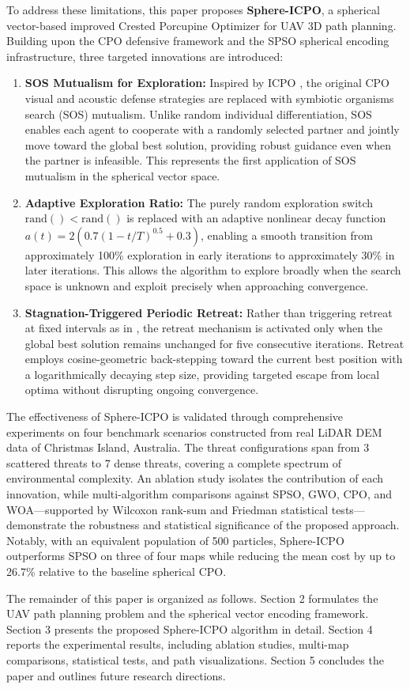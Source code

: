 To address these limitations, this paper proposes \textbf{Sphere-ICPO}, a spherical vector-based improved Crested Porcupine Optimizer for UAV 3D path planning. Building upon the CPO defensive framework and the SPSO spherical encoding infrastructure, three targeted innovations are introduced:

\begin{enumerate}
    \item \textbf{SOS Mutualism for Exploration:} Inspired by ICPO \cite{icpo2024}, the original CPO visual and acoustic defense strategies are replaced with symbiotic organisms search (SOS) mutualism. Unlike random individual differentiation, SOS enables each agent to cooperate with a randomly selected partner and jointly move toward the global best solution, providing robust guidance even when the partner is infeasible. This represents the first application of SOS mutualism in the spherical vector space.

    \item \textbf{Adaptive Exploration Ratio:} The purely random exploration switch $\text{rand}() < \text{rand}()$ is replaced with an adaptive nonlinear decay function $a(t) = 2(0.7(1 - t/T)^{0.5} + 0.3)$, enabling a smooth transition from approximately 100\% exploration in early iterations to approximately 30\% in later iterations. This allows the algorithm to explore broadly when the search space is unknown and exploit precisely when approaching convergence.

    \item \textbf{Stagnation-Triggered Periodic Retreat:} Rather than triggering retreat at fixed intervals as in \cite{icpo2024}, the retreat mechanism is activated only when the global best solution remains unchanged for five consecutive iterations. Retreat employs cosine-geometric back-stepping toward the current best position with a logarithmically decaying step size, providing targeted escape from local optima without disrupting ongoing convergence.
\end{enumerate}

The effectiveness of Sphere-ICPO is validated through comprehensive experiments on four benchmark scenarios constructed from real LiDAR DEM data of Christmas Island, Australia. The threat configurations span from 3 scattered threats to 7 dense threats, covering a complete spectrum of environmental complexity. An ablation study isolates the contribution of each innovation, while multi-algorithm comparisons against SPSO, GWO, CPO, and WOA—supported by Wilcoxon rank-sum and Friedman statistical tests—demonstrate the robustness and statistical significance of the proposed approach. Notably, with an equivalent population of 500 particles, Sphere-ICPO outperforms SPSO on three of four maps while reducing the mean cost by up to 26.7\% relative to the baseline spherical CPO.

The remainder of this paper is organized as follows. Section 2 formulates the UAV path planning problem and the spherical vector encoding framework. Section 3 presents the proposed Sphere-ICPO algorithm in detail. Section 4 reports the experimental results, including ablation studies, multi-map comparisons, statistical tests, and path visualizations. Section 5 concludes the paper and outlines future research directions.
